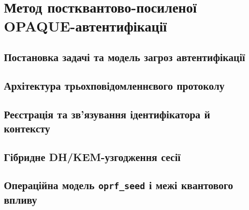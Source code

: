 \chapter{Метод постквантово-посиленої OPAQUE-автентифікації}
\label{ch:opaque}


\section{Постановка задачі та модель загроз автентифікації}
\label{sec:opaque-threat}

\section{Архітектура трьохповідомленнєвого протоколу}
\label{sec:opaque-arch}

\section{Реєстрація та зв'язування ідентифікатора й контексту}
\label{sec:opaque-registration}

\section{Гібридне DH/KEM-узгодження сесії}
\label{sec:opaque-hybrid}

\section{Операційна модель \texttt{oprf\_seed} і межі квантового впливу}
\label{sec:opaque-oprf}

